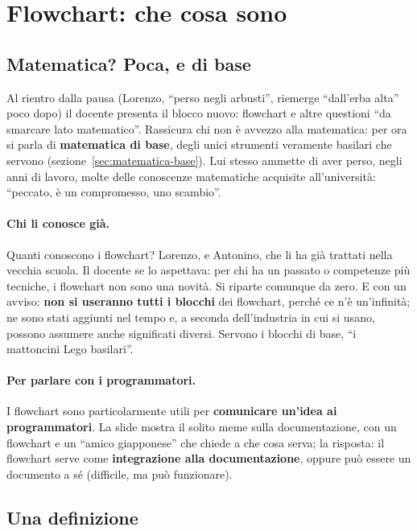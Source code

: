 \section{Flowchart: che cosa sono}
\label{sec:flowchart-cosa}

\subsection{Matematica? Poca, e di base}

Al rientro dalla pausa (Lorenzo, ``perso negli arbusti'', riemerge ``dall'erba
alta'' poco dopo) il docente presenta il blocco nuovo: flowchart e altre
questioni ``da smarcare lato matematico''. Rassicura chi non è avvezzo alla
matematica: per ora si parla di \textbf{matematica di base}, degli unici
strumenti veramente basilari che servono
(sezione~\ref{sec:matematica-base}). Lui stesso ammette di aver perso, negli
anni di lavoro, molte delle conoscenze matematiche acquisite all'università:
``peccato, è un compromesso, uno scambio''.

\paragraph{Chi li conosce già.} Quanti conoscono i flowchart? Lorenzo, e
Antonino, che li ha già trattati nella vecchia scuola. Il docente se lo
aspettava: per chi ha un passato o competenze più tecniche, i flowchart non
sono una novità. Si riparte comunque da zero. E con un avviso: \textbf{non si
useranno tutti i blocchi} dei flowchart, perché ce n'è un'infinità; ne sono
stati aggiunti nel tempo e, a seconda dell'industria in cui si usano, possono
assumere anche significati diversi. Servono i blocchi di base, ``i
mattoncini Lego basilari''.

\paragraph{Per parlare con i programmatori.} I flowchart sono
particolarmente utili per \textbf{comunicare un'idea ai programmatori}. La
slide mostra il solito meme sulla documentazione, con un flowchart e un
``amico giapponese'' che chiede a che cosa serva; la risposta: il flowchart
serve come \textbf{integrazione alla documentazione}, oppure può essere un
documento a sé (difficile, ma può funzionare).

\subsection{Una definizione}

